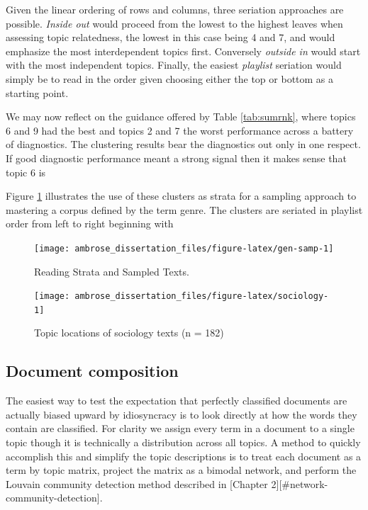 \documentclass[]{book}
\theoremstyle{definition}
\theoremstyle{definition}
\theoremstyle{definition}
\theoremstyle{remark}
\begin{document}
Given the linear ordering of rows and columns, three seriation
approaches are possible. \emph{Inside out} would proceed from the lowest
to the highest leaves when assessing topic relatedness, the lowest in
this case being 4 and 7, and would emphasize the most interdependent
topics first. Conversely \emph{outside in} would start with the most
independent topics. Finally, the easiest \emph{playlist} seriation would
simply be to read in the order given choosing either the top or bottom
as a starting point.

We may now reflect on the guidance offered by Table \ref{tab:sumrnk},
where topics 6 and 9 had the best and topics 2 and 7 the worst
performance across a battery of diagnostics. The clustering results bear
the diagnostics out only in one respect. If good diagnostic performance
meant a strong signal then it makes sense that topic 6 is

Figure \ref{fig:gen-samp} illustrates the use of these clusters as
strata for a sampling approach to mastering a corpus defined by the term
genre. The clusters are seriated in playlist order from left to right
beginning with

\begin{figure}

{\centering \texttt{[image: ambrose\_dissertation\_files/figure-latex/gen-samp-1]} 

}

\caption{Reading Strata and Sampled Texts.}\label{fig:gen-samp}
\end{figure}

\begin{figure}

{\centering \texttt{[image: ambrose\_dissertation\_files/figure-latex/sociology-1]} 

}

\caption{Topic locations of sociology texts (n = 182)}\label{fig:sociology}
\end{figure}

\hypertarget{document-composition}{%
\subsection{Document composition}\label{document-composition}}

The easiest way to test the expectation that perfectly classified
documents are actually biased upward by idiosyncracy is to look directly
at how the words they contain are classified. For clarity we assign
every term in a document to a single topic though it is technically a
distribution across all topics. A method to quickly accomplish this and
simplify the topic descriptions is to treat each document as a term by
topic matrix, project the matrix as a bimodal network, and perform the
Louvain community detection method described in {[}Chapter
2{]}{[}\#network-community-detection{]}.
\end{document}
